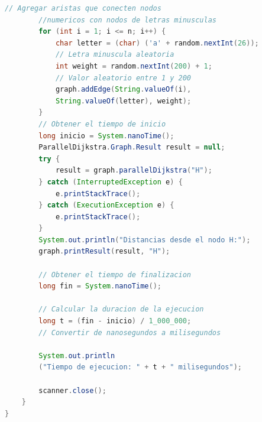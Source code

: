 \begin{lstlisting}[language=Java, style=ColorStyle]
        // Agregar aristas que conecten nodos 
        //numericos con nodos de letras minusculas
        for (int i = 1; i <= n; i++) {
            char letter = (char) ('a' + random.nextInt(26)); 
            // Letra minuscula aleatoria
            int weight = random.nextInt(200) + 1; 
            // Valor aleatorio entre 1 y 200
            graph.addEdge(String.valueOf(i), 
            String.valueOf(letter), weight);
        }
        // Obtener el tiempo de inicio
        long inicio = System.nanoTime();
        ParallelDijkstra.Graph.Result result = null;
        try {
            result = graph.parallelDijkstra("H");
        } catch (InterruptedException e) {
            e.printStackTrace();
        } catch (ExecutionException e) {
            e.printStackTrace();
        }
        System.out.println("Distancias desde el nodo H:");
        graph.printResult(result, "H");

        // Obtener el tiempo de finalizacion
        long fin = System.nanoTime();

        // Calcular la duracion de la ejecucion
        long t = (fin - inicio) / 1_000_000;
        // Convertir de nanosegundos a milisegundos

        System.out.println
        ("Tiempo de ejecucion: " + t + " milisegundos");

        scanner.close();
    }
}

\end{lstlisting}